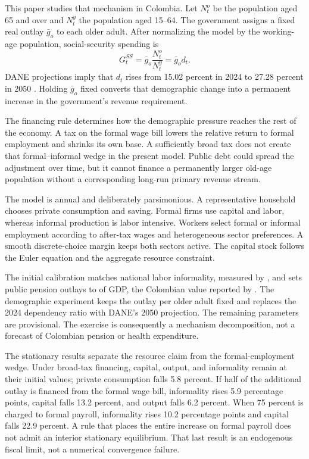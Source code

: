 \documentclass[12pt]{article}
\begin{document}
This paper studies that mechanism in Colombia. Let $N_t^o$ be the population
aged 65 and over and $N_t^y$ the population aged 15--64. The government assigns
a fixed real outlay $\bar g_o$ to each older adult. After normalizing the model
by the working-age population, social-security spending is
\[
  G_t^{SS}=\bar g_o\frac{N_t^o}{N_t^y}=\bar g_o d_t.
\]
DANE projections imply that $d_t$ rises from 15.02 percent in 2024 to 27.28
percent in 2050 \citep{DANE2025Projections}. Holding $\bar g_o$ fixed converts
that demographic change into a permanent increase in the government's revenue
requirement.

The financing rule determines how the demographic pressure reaches the rest
of the economy. A tax on the formal wage bill lowers the relative return to
formal employment and shrinks its own base. A sufficiently broad tax does not
create that formal--informal wedge in the present model. Public debt could
spread the adjustment over time, but it cannot finance a permanently larger
old-age population without a corresponding long-run primary revenue stream.

The model is annual and deliberately parsimonious. A representative household
chooses private consumption and saving. Formal firms use capital and labor,
whereas informal production is labor intensive. Workers select formal or
informal employment according to after-tax wages and heterogeneous sector
preferences. A smooth discrete-choice margin keeps both sectors active. The
capital stock follows the Euler equation and the aggregate resource constraint.

The initial calibration matches \BenchmarkInformality{} national labor
informality, measured by \citet{DANE2025Informality}, and sets public pension
outlays to \BenchmarkGovernmentShare{} of GDP, the Colombian value reported by
\citet{OECD2023Colombia}. The demographic experiment keeps the outlay per older
adult fixed and replaces the 2024 dependency ratio with DANE's 2050 projection.
The remaining parameters are provisional. The exercise is consequently a
mechanism decomposition, not a forecast of Colombian pension or health
expenditure.

The stationary results separate the resource claim from the formal-employment
wedge. Under broad-tax financing, capital, output, and informality remain at
their initial values; private consumption falls 5.8 percent. If half of the
additional outlay is financed from the formal wage bill, informality rises 5.9
percentage points, capital falls 13.2 percent, and output falls 6.2 percent.
When 75 percent is charged to formal payroll, informality rises 10.2 percentage
points and capital falls 22.9 percent. A rule that places the entire increase
on formal payroll does not admit an interior stationary equilibrium. That last
result is an endogenous fiscal limit, not a numerical convergence failure.
\end{document}
